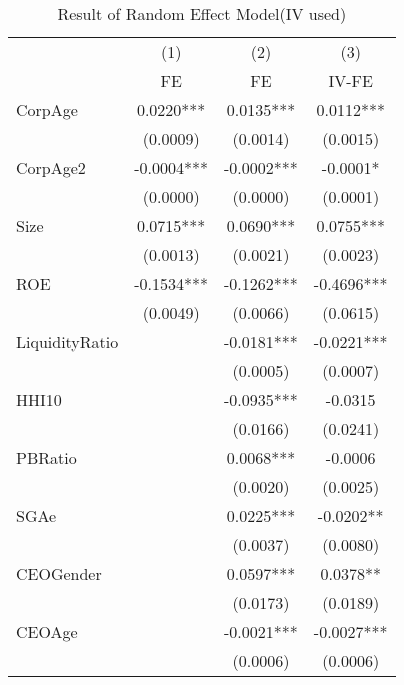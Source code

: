 \begin{table}[htbp]\centering
\def\sym#1{\ifmmode^{#1}\else\(^{#1}\)\fi}
\caption{Result of Random Effect Model(IV used) \label{tab:regressionRE}}
\begin{tabular}{l*{3}{c}}
\hline\hline
            &\multicolumn{1}{c}{(1)}&\multicolumn{1}{c}{(2)}&\multicolumn{1}{c}{(3)}\\
            &\multicolumn{1}{c}{FE}&\multicolumn{1}{c}{FE}&\multicolumn{1}{c}{IV-FE}\\
\hline
CorpAge     &      0.0220***&      0.0135***&      0.0112***\\
            &    (0.0009)   &    (0.0014)   &    (0.0015)   \\
[1em]
CorpAge2    &     -0.0004***&     -0.0002***&     -0.0001*  \\
            &    (0.0000)   &    (0.0000)   &    (0.0001)   \\
[1em]
Size        &      0.0715***&      0.0690***&      0.0755***\\
            &    (0.0013)   &    (0.0021)   &    (0.0023)   \\
[1em]
ROE         &     -0.1534***&     -0.1262***&     -0.4696***\\
            &    (0.0049)   &    (0.0066)   &    (0.0615)   \\
[1em]
LiquidityRatio&               &     -0.0181***&     -0.0221***\\
            &               &    (0.0005)   &    (0.0007)   \\
[1em]
HHI10       &               &     -0.0935***&     -0.0315   \\
            &               &    (0.0166)   &    (0.0241)   \\
[1em]
PBRatio     &               &      0.0068***&     -0.0006   \\
            &               &    (0.0020)   &    (0.0025)   \\
[1em]
SGAe        &               &      0.0225***&     -0.0202** \\
            &               &    (0.0037)   &    (0.0080)   \\
[1em]
CEOGender   &               &      0.0597***&      0.0378** \\
            &               &    (0.0173)   &    (0.0189)   \\
[1em]
CEOAge      &               &     -0.0021***&     -0.0027***\\
            &               &    (0.0006)   &    (0.0006)   \\

\end{tabular}
\end{table}

